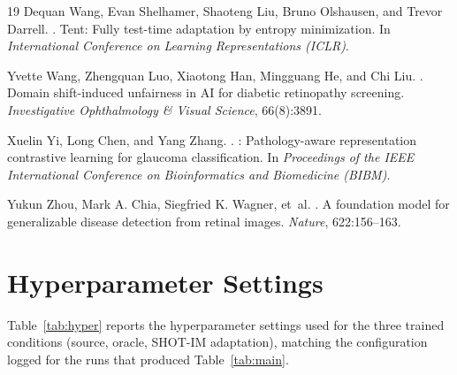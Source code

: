 \documentclass[11pt]{article}
\begin{document}
\begin{thebibliography}{19}
Dequan Wang, Evan Shelhamer, Shaoteng Liu, Bruno Olshausen, and Trevor Darrell.
.
\newblock Tent: Fully test-time adaptation by entropy minimization.
\newblock In \textit{International Conference on Learning Representations
  (ICLR)}.

Yvette Wang, Zhengquan Luo, Xiaotong Han, Mingguang He, and Chi Liu.
.
\newblock Domain shift-induced unfairness in {AI} for diabetic retinopathy screening.
\newblock \textit{Investigative Ophthalmology \& Visual Science}, 66(8):3891.

Xuelin Yi, Long Chen, and Yang Zhang.
.
: Pathology-aware representation contrastive learning for
  glaucoma classification.
\newblock In \textit{Proceedings of the IEEE International Conference on
  Bioinformatics and Biomedicine (BIBM)}.

Yukun Zhou, Mark A. Chia, Siegfried K. Wagner, et~al.
.
\newblock A foundation model for generalizable disease detection from retinal
  images.
\newblock \textit{Nature}, 622:156--163.

\end{thebibliography}

\clearpage
\appendix

\section{Hyperparameter Settings}
\label{app:hyperparams}

Table~\ref{tab:hyper} reports the hyperparameter settings used for the
three trained conditions (source, oracle, SHOT-IM adaptation),
matching the configuration logged for the runs that produced
Table~\ref{tab:main}.
\end{document}
